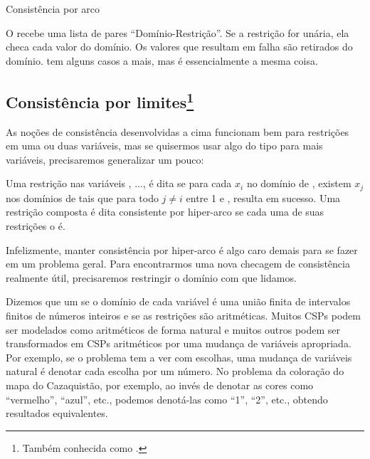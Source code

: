 \documentclass{article}
\begin{document}
    \begin{listing}[H]
\inputminted{prolog}{../Exemplos/Cap9/arc_consistency.pl}\label{lst:arc_consistency}
\caption{Consistência por arco}
    \end{listing}

O  recebe uma lista de pares ``Domínio-Restrição''. Se a restrição for unária, ela checa cada valor do domínio.
Os valores que resultam em falha são retirados do domínio.  tem alguns casos a mais, mas é essencialmente a mesma coisa.

\subsection{Consistência por limites\footnote{Também conhecida como .}}

As noções de consistência desenvolvidas a cima funcionam bem para restrições em uma ou duas variáveis,
mas se quisermos usar algo do tipo para mais variáveis, precisaremos generalizar um pouco:

\begin{definition}
  Uma restrição  nas variáveis , ...,  é dita 
  se para cada $x_i$ no domínio de , existem $x_j$ nos domínios de  tais que
  para todo $j \neq i$ entre 1 e ,  resulta em
  sucesso. Uma restrição composta é dita consistente por hiper-arco se cada uma de suas restrições o é.
\end{definition}

Infelizmente, manter consistência por hiper-arco é algo caro demais para se fazer em um problema geral. Para
encontrarmos uma nova checagem de consistência realmente útil, precisaremos restringir o domínio com que lidamos.

Dizemos que um  se o domínio de cada variável é uma união
finita de intervalos finitos de números inteiros e se as restrições são aritméticas. Muitos CSPs
podem ser modelados como aritméticos de forma natural e muitos outros podem ser transformados em
CSPs aritméticos por uma mudança de variáveis apropriada.
Por exemplo, se o problema tem a ver com escolhas, uma mudança de variáveis natural é denotar cada
escolha por um número. No problema da coloração do mapa do Cazaquistão, por exemplo, ao invés de
denotar as cores como ``vermelho'', ``azul'', etc., podemos denotá-las como ``1'', ``2'', etc., obtendo resultados equivalentes.
\end{document}
